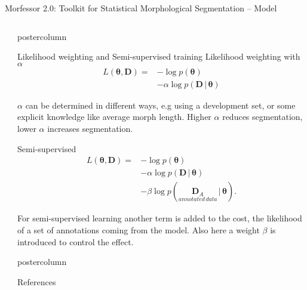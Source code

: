 \documentclass[final]{beamer} %
\newcommand{\seq}[1]{\boldsymbol{#1}}
\newcommand{\cost}{L}
\newcommand{\params}{\boldsymbol{\theta}}
\newcommand{\data}{\seq{D}}
\newcommand{\vb}{\,|\,}
\begin{document}
\begin{frame}{Morfessor 2.0: Toolkit for Statistical Morphological Segmentation -- Model}
\begin{columns}
\begin{column}{.3\textwidth}
\end{column}
\begin{column}{.3\textwidth}




      \begin{beamercolorbox}[center,wd=\textwidth]{postercolumn}
 \begin{block}{Likelihood weighting and Semi-supervised training }
Likelihood weighting with $\alpha$ \citep{kohonen2010semisupervised,virpioja2011nodalida}
\begin{align*}
  \cost(\params, \data) =& - \log p(\params) \\&- \alpha \log p(\data
  \vb \params)
\end{align*}

$\alpha$ can be determined in different ways, e.g using a development set, or some explicit knowledge like average morph length. Higher $\alpha$ reduces segmentation, lower $\alpha$ increases segmentation.

Semi-supervised \citep{kohonen2010sigmorphon}
\begin{align*}
  \cost(\params, \data) = & - \log p(\params) \\&- \alpha \log p(\data
  \vb \params) \\&- \beta \log p(\underset{annotated\,data}{\data_{A}} \vb \params).
\end{align*}

For semi-supervised learning another term is added to the cost, the likelihood of a set of annotations coming from the model. Also here a weight $\beta$ is introduced to control the effect.

            \end{block}
	\end{beamercolorbox}


  \begin{beamercolorbox}[center,wd=\textwidth]{postercolumn}
 \begin{block}{References}
\footnotesize

           
            \end{block}
            
	\end{beamercolorbox}




\end{column}

\end{columns}
 \end{frame}



  
\end{document}
